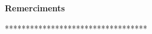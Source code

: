 \vspace{0.5cm}

\centerline{\textbf{Remerciments}}
\vspace{1.5cm}
**********************************
